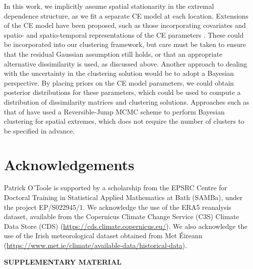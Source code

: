 \documentclass[12pt,compact]{article}
\begin{document}
In this work, we implicitly assume spatial stationarity in the extremal dependence structure, as we fit a separate CE model at each location.
Extensions of the CE model have been proposed, such as those incorporating covariates \citep{Richards2023} and spatio- and spatio-temporal representations of the CE parameters \citep{Simpson2021, Wadsworth2022}.
These could be incorporated into our clustering framework, but care must be taken to ensure that the residual Gaussian assumption still holds, or that an appropriate alternative dissimilarity is used, as discussed above.
Another approach to dealing with the uncertainty in the clustering solution would be to adopt a Bayesian perspective.
By placing priors on the CE model parameters, we could obtain posterior distributions for these parameters, which could be used to compute a distribution of dissimilarity matrices and clustering solutions.
Approaches such as that of \citet{Rohrbeck2021} have used a Reversible-Jump MCMC scheme to perform Bayesian clustering for spatial extremes, which does not require the number of clusters to be specified in advance.

\section*{Acknowledgements}

Patrick O'Toole is supported by a scholarship from the EPSRC Centre for Doctoral Training in Statistical Applied Mathematics at Bath (SAMBa), under the project EP/S022945/1.
We acknowledge the use of the ERA5 reanalysis dataset, available from the Copernicus Climate Change Service (C3S) Climate Data Store (CDS) (\url{https://cds.climate.copernicus.eu/}). 
We also acknowledge the use of the Irish meteorological dataset obtained from Met Éireann (\url{https://www.met.ie/climate/available-data/historical-data}).

\bigskip
\begin{center}
{\large\bf SUPPLEMENTARY MATERIAL}
\end{center}
\end{document}
